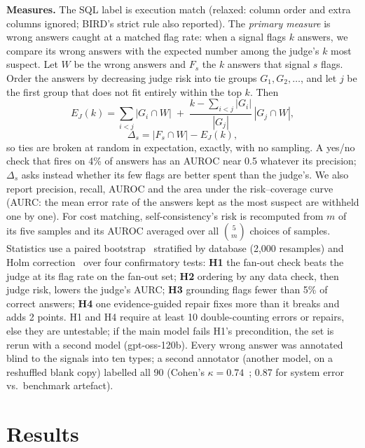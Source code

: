 \documentclass[conference]{IEEEtran}
\begin{document}
\textbf{Measures.} The SQL label is execution match (relaxed: column order and extra columns ignored;
BIRD's strict rule also reported). The \emph{primary measure} is wrong answers caught at a matched
flag rate: when a signal flags $k$ answers, we compare its wrong answers with the expected number among
the judge's $k$ most suspect. Let $W$ be the wrong answers and $F_s$ the $k$ answers that signal $s$
flags. Order the answers by decreasing judge risk into tie groups $G_1, G_2, \dots$, and let $j$ be the
first group that does not fit entirely within the top $k$. Then
\begin{equation}
E_J(k)=\sum_{i<j}|G_i\cap W| \;+\; \frac{k-\sum_{i<j}|G_i|}{|G_j|}\,|G_j\cap W|,
\end{equation}
\begin{equation}
\Delta_s = |F_s\cap W| - E_J(k),
\end{equation}
so ties are broken at random in expectation, exactly, with no sampling. A yes/no check that fires on
4\% of answers has an AUROC near 0.5 whatever its precision; $\Delta_s$ asks instead whether its few
flags are better spent than the judge's. We also report precision, recall, AUROC and the area under the
risk--coverage curve (AURC: the mean error rate of the answers kept as the most suspect are withheld
one by one). For cost matching, self-consistency's risk is recomputed from $m$ of its five samples and
its AUROC averaged over all $\binom{5}{m}$ choices of samples. Statistics use a paired bootstrap~\cite{efron1979bootstrap}
stratified by database (2,000 resamples) and Holm correction~\cite{holm1979simple} over four confirmatory tests: \textbf{H1}
the fan-out check beats the judge at its flag rate on the fan-out set; \textbf{H2} ordering by any
data check, then judge risk, lowers the judge's AURC; \textbf{H3} grounding flags fewer than 5\% of
correct answers; \textbf{H4} one evidence-guided repair fixes more than it breaks and adds 2 points.
H1 and H4 require at least 10 double-counting errors or repairs, else they are untestable; if the main
model fails H1's precondition, the set is rerun with a second model (gpt-oss-120b). Every wrong answer
was annotated blind to the signals into ten types; a second annotator (another model, on a reshuffled
blank copy) labelled all 90 (Cohen's $\kappa=0.74$~\cite{cohen1960coefficient}; 0.87 for system error vs.\ benchmark artefact).

\section{Results}
\end{document}
